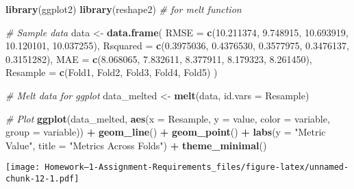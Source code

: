\documentclass[
]{article}
\newenvironment{Shaded}{\begin{snugshade}}{\end{snugshade}}
\newcommand{\AttributeTok}[1]{\textcolor[rgb]{0.13,0.29,0.53}{#1}}
\newcommand{\CommentTok}[1]{\textcolor[rgb]{0.56,0.35,0.01}{\textit{#1}}}
\newcommand{\FloatTok}[1]{\textcolor[rgb]{0.00,0.00,0.81}{#1}}
\newcommand{\FunctionTok}[1]{\textcolor[rgb]{0.13,0.29,0.53}{\textbf{#1}}}
\newcommand{\NormalTok}[1]{#1}
\newcommand{\OtherTok}[1]{\textcolor[rgb]{0.56,0.35,0.01}{#1}}
\newcommand{\SpecialCharTok}[1]{\textcolor[rgb]{0.81,0.36,0.00}{\textbf{#1}}}
\newcommand{\StringTok}[1]{\textcolor[rgb]{0.31,0.60,0.02}{#1}}
\begin{document}
\begin{Shaded}
\begin{Highlighting}[]
\FunctionTok{library}\NormalTok{(ggplot2)}
\FunctionTok{library}\NormalTok{(reshape2) }\CommentTok{\# for melt function}

\CommentTok{\# Sample data}
\NormalTok{data }\OtherTok{\textless{}{-}} \FunctionTok{data.frame}\NormalTok{(}
  \AttributeTok{RMSE =} \FunctionTok{c}\NormalTok{(}\FloatTok{10.211374}\NormalTok{, }\FloatTok{9.748915}\NormalTok{, }\FloatTok{10.693919}\NormalTok{, }\FloatTok{10.120101}\NormalTok{, }\FloatTok{10.037255}\NormalTok{),}
  \AttributeTok{Rsquared =} \FunctionTok{c}\NormalTok{(}\FloatTok{0.3975036}\NormalTok{, }\FloatTok{0.4376530}\NormalTok{, }\FloatTok{0.3577975}\NormalTok{, }\FloatTok{0.3476137}\NormalTok{, }\FloatTok{0.3151282}\NormalTok{),}
  \AttributeTok{MAE =} \FunctionTok{c}\NormalTok{(}\FloatTok{8.068065}\NormalTok{, }\FloatTok{7.832611}\NormalTok{, }\FloatTok{8.377911}\NormalTok{, }\FloatTok{8.179323}\NormalTok{, }\FloatTok{8.261450}\NormalTok{),}
  \AttributeTok{Resample =} \FunctionTok{c}\NormalTok{(}\StringTok{\textquotesingle{}Fold1\textquotesingle{}}\NormalTok{, }\StringTok{\textquotesingle{}Fold2\textquotesingle{}}\NormalTok{, }\StringTok{\textquotesingle{}Fold3\textquotesingle{}}\NormalTok{, }\StringTok{\textquotesingle{}Fold4\textquotesingle{}}\NormalTok{, }\StringTok{\textquotesingle{}Fold5\textquotesingle{}}\NormalTok{)}
\NormalTok{)}

\CommentTok{\# Melt data for ggplot}
\NormalTok{data\_melted }\OtherTok{\textless{}{-}} \FunctionTok{melt}\NormalTok{(data, }\AttributeTok{id.vars =} \StringTok{\textquotesingle{}Resample\textquotesingle{}}\NormalTok{)}

\CommentTok{\# Plot}
\FunctionTok{ggplot}\NormalTok{(data\_melted, }\FunctionTok{aes}\NormalTok{(}\AttributeTok{x =}\NormalTok{ Resample, }\AttributeTok{y =}\NormalTok{ value, }\AttributeTok{color =}\NormalTok{ variable, }\AttributeTok{group =}\NormalTok{ variable)) }\SpecialCharTok{+}
  \FunctionTok{geom\_line}\NormalTok{() }\SpecialCharTok{+}
  \FunctionTok{geom\_point}\NormalTok{() }\SpecialCharTok{+}
  \FunctionTok{labs}\NormalTok{(}\AttributeTok{y =} \StringTok{"Metric Value"}\NormalTok{, }\AttributeTok{title =} \StringTok{"Metrics Across Folds"}\NormalTok{) }\SpecialCharTok{+}
  \FunctionTok{theme\_minimal}\NormalTok{()}
\end{Highlighting}
\end{Shaded}

\texttt{[image: Homework--1-Assignment-Requirements\_files/figure-latex/unnamed-chunk-12-1.pdf]}
\end{document}
